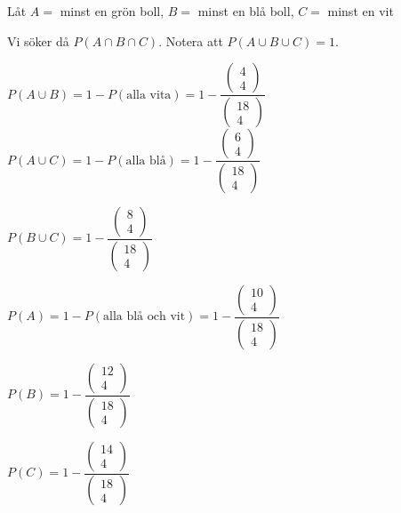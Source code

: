 \noindent Låt $A=$ minst en grön boll, $B = $ minst en blå boll, $C=$ minst en vit\par
\noindent Vi söker då $P(A\cap B\cap C)$. Notera att $P(A\cup B\cup C) = 1$.\par
\noindent $P(A\cup B) = 1-P(\text{alla vita}) = 1- \dfrac{\begin{pmatrix}4\\4\end{pmatrix}}{\begin{pmatrix}18\\4\end{pmatrix}}$\\
\noindent $P(A\cup C) = 1-P(\text{alla blå}) = 1-\dfrac{\begin{pmatrix}6\\4\end{pmatrix}}{\begin{pmatrix}18\\4\end{pmatrix}}$\par
\noindent $P(B\cup C) = 1-\dfrac{\begin{pmatrix}8\\4\end{pmatrix}}{\begin{pmatrix}18\\4\end{pmatrix}}$\par
\noindent $P(A) = 1-P(\text{alla blå och vit}) = 1-\dfrac{\begin{pmatrix}10\\4\end{pmatrix}}{\begin{pmatrix}18\\4\end{pmatrix}}$\par
\noindent $P(B) = 1-\dfrac{\begin{pmatrix}12\\4\end{pmatrix}}{\begin{pmatrix}18\\4\end{pmatrix}}$\par
\noindent $P(C) = 1-\dfrac{\begin{pmatrix}14\\4\end{pmatrix}}{\begin{pmatrix}18\\4\end{pmatrix}}$\par
